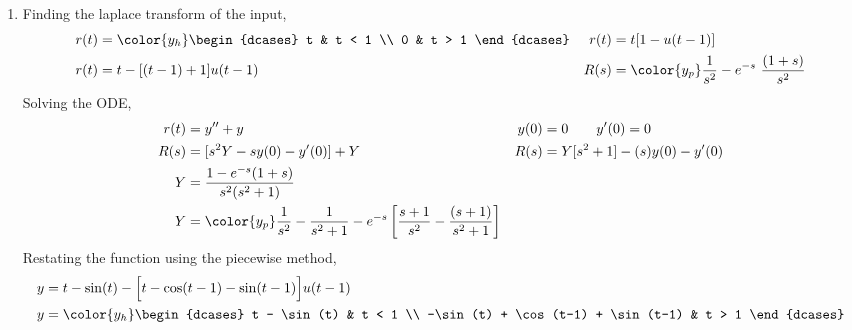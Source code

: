 \begin{enumerate}
    \item Finding the laplace transform of the input,
          \begin{align}
              r(t)           & = \color{y_h}
              \begin{dcases}
                  t & t < 1 \\
                  0 & t > 1
              \end{dcases} &
              r(t)           & = t[1 - u(t-1)]                                             \\
              r(t)           & = t - [(t-1) + 1]u(t-1)                                   &
              R(s)           & = \color{y_p} \frac{1}{s^2} - e^{-s}\ \frac{(1 + s)}{s^2}
          \end{align}
          Solving the ODE,
          \begin{align}
              r(t) & = y'' + y                                       &
              y(0) & = 0 \qquad y'(0) = 0                              \\
              R(s) & = [s^2Y - sy(0) - y'(0)] + Y                    &
              R(s) & = Y[s^2 + 1] - (s)y(0) - y'(0)                    \\
              Y    & = \frac{1 - e^{-s}(1 + s)}{s^2(s^2 + 1)}          \\
              Y    & = \color{y_p} \frac{1}{s^2} - \frac{1}{s^2 + 1}
              -e^{-s}\left[ \frac{s+1}{s^2} - \frac{(s+1)}{s^2 + 1} \right]
          \end{align}
          Restating the function using the piecewise method,
          \begin{align}
              y & = t - \sin(t) - \Big[ t - \cos(t-1) - \sin(t-1) \Big]u(t-1) \\
              y & = \color{y_h}
              \begin{dcases}
                  t - \sin(t)                      & t < 1 \\
                  -\sin(t) + \cos(t-1) + \sin(t-1) & t > 1
              \end{dcases}
          \end{align}


\end{enumerate}
